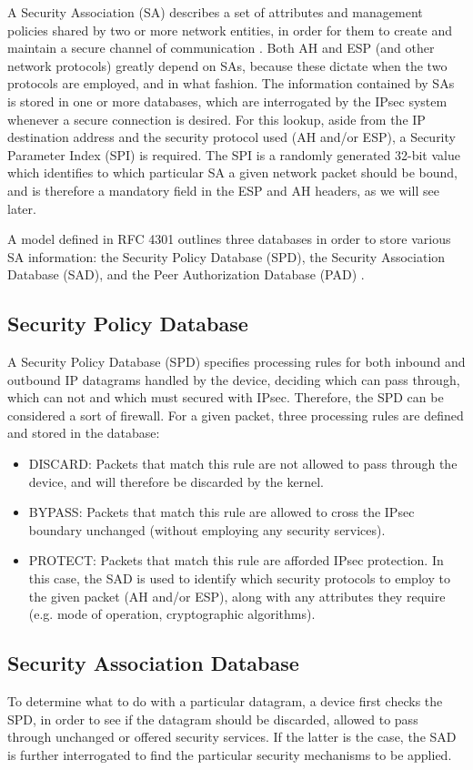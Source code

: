 \documentclass[a4paper,12pt]{report}
\begin{document}
	A Security Association (SA) describes a set of attributes and management policies shared by two or more network entities, in order for them to create and maintain a secure channel of communication \cite{rfc2408}. Both AH and ESP (and other network protocols) greatly depend on SAs, because these dictate when the two protocols are employed, and in what fashion. The information contained by SAs is stored in one or more databases, which are interrogated by the IPsec system whenever a secure connection is desired. For this lookup, aside from the IP destination address and the security protocol used (AH and/or ESP), a Security Parameter Index (SPI) is required. The SPI is a randomly generated 32-bit value which identifies to which particular SA a given network packet should be bound, and is therefore a mandatory field in the ESP and AH headers, as we will see later.
	
	A model defined in RFC 4301 outlines three databases in order to store various SA information: the Security Policy Database (SPD), the Security Association Database (SAD), and the Peer Authorization Database (PAD) \cite{rfc4301}.
	
	\subsection{Security Policy Database}
		A Security Policy Database (SPD) specifies processing rules for both inbound and outbound IP datagrams handled by the device, deciding which can pass through, which can not and which must secured with IPsec. Therefore, the SPD can be considered a sort of firewall. For a given packet, three processing rules are defined and stored in the database:
		\begin{itemize}
			\item DISCARD: Packets that match this rule are not allowed to pass through the device, and will therefore be discarded by the kernel.
			\item BYPASS: Packets that match this rule are allowed to cross the IPsec boundary unchanged (without employing any security services).
			\item PROTECT: Packets that match this rule are afforded IPsec protection. In this case, the SAD is used to identify which security protocols to employ to the given packet (AH and/or ESP), along with any attributes they require (e.g. mode of operation, cryptographic algorithms).
		\end{itemize}
		
	\subsection{Security Association Database}
		To determine what to do with a particular datagram, a device first checks the SPD, in order to see if the datagram should be discarded, allowed to pass through unchanged or offered security services. If the latter is the case, the SAD is further interrogated to find the particular security mechanisms to be applied.
		
\end{document}
